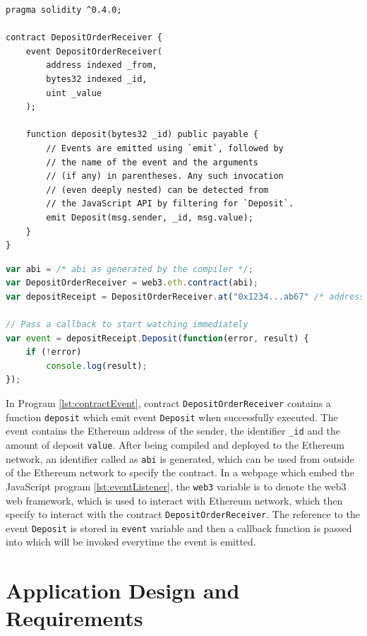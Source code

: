 \documentclass[twoside,numperchapter]{tutthesis} %
\begin{document}
\begin{lstlisting}[float,caption={Contract with Event derived from \citep{SolidityDocumentation}.},label={lst:contractEvent},language=Solidity]
pragma solidity ^0.4.0;

contract DepositOrderReceiver {
    event DepositOrderReceiver(
        address indexed _from,
        bytes32 indexed _id,
        uint _value
    );

    function deposit(bytes32 _id) public payable {
        // Events are emitted using `emit`, followed by
        // the name of the event and the arguments
        // (if any) in parentheses. Any such invocation
        // (even deeply nested) can be detected from
        // the JavaScript API by filtering for `Deposit`.
        emit Deposit(msg.sender, _id, msg.value);
    }
}
\end{lstlisting}

\begin{lstlisting}[float,caption={Listening to Event from web applications \citep{SolidityDocumentation}.},label={lst:eventListener},language=JavaScript]
var abi = /* abi as generated by the compiler */;
var DepositOrderReceiver = web3.eth.contract(abi);
var depositReceipt = DepositOrderReceiver.at("0x1234...ab67" /* address */);

// Pass a callback to start watching immediately
var event = depositReceipt.Deposit(function(error, result) {
    if (!error)
        console.log(result);
});
\end{lstlisting}

In Program \ref{lst:contractEvent}, contract \texttt{DepositOrderReceiver} contains a function \texttt{deposit} which emit event \texttt{Deposit} when successfully executed. The event contains the Ethereum address of the sender, the identifier \texttt{\_id} and the amount of deposit \texttt{value}. After being compiled and deployed to the Ethereum network, an identifier called as \texttt{abi} is generated, which can be used from outside of the Ethereum network to specify the contract. In a webpage which embed the JavaScript program \ref{lst:eventListener},  the \texttt{web3} variable is to denote the web3 web framework, which is used to interact with Ethereum network, which then specify to interact with the contract \texttt{DepositOrderReceiver}. The reference to the event \texttt{Deposit} is stored in \texttt{event} variable and then a callback function is passed into which will be invoked everytime the event is emitted.

\chapter{Application Design and Requirements}
\label{ch:ApplicationDesignAndReq}
\end{document}
